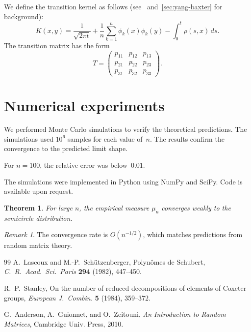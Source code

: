\documentclass{amsart}
\theoremstyle{plain}
\newtheorem{theorem}{Theorem}[section]
\theoremstyle{definition}
\theoremstyle{remark}
\newtheorem*{remark}{Remark}
\begin{document}
We define the transition kernel as follows (see~\cite{AGZ2010}
and~\ref{sec:yang-baxter} for background):
\begin{equation*}
K(x,y) = \frac{1}{\sqrt{2\pi t}}
        + \frac{1}{n} \sum_{k=1}^{n} \phi_k(x) \phi_k(y)
        - \int_0^t \rho(s,x)\, ds.
\end{equation*}
The transition matrix has the form
\begin{equation}
\label{eq:tmatrix}
T =
\begin{pmatrix} p_{11} & p_{12} & p_{13} \\ p_{21} & p_{22} & p_{23} \\ p_{31} & p_{32} & p_{33} \end{pmatrix}.
\end{equation}

\section{Numerical experiments}
\label{sec:numerical}
    We performed Monte Carlo simulations to verify the theoretical
    predictions.  The simulations used $10^6$ samples for each value
    of~$n$.    The results confirm the convergence to the predicted
    limit shape.

    For $n = 100$, the relative error was below~$0.01$.

    The simulations were implemented in Python using NumPy and SciPy.
    Code is available upon request.

\begin{theorem}
For large $n$, the empirical measure $\mu_n$ converges weakly to the
semicircle distribution.
\end{theorem}

\begin{remark}
The convergence rate is $O(n^{-1/2})$, which matches predictions from
random matrix theory.
\end{remark}

\begin{thebibliography}{99}
 A.~Lascoux and M.-P.~Sch\"utzenberger,
  Polyn\^omes de Schubert,
  \emph{C.~R.~Acad.~Sci.~Paris} \textbf{294} (1982), 447--450.

 R.~P.~Stanley,
  On the number of reduced decompositions of elements of Coxeter groups,
  \emph{European J.~Combin.} \textbf{5} (1984), 359--372.

 G.~Anderson, A.~Guionnet, and O.~Zeitouni,
  \emph{An Introduction to Random Matrices},
  Cambridge Univ. Press, 2010.
\end{thebibliography}
\end{document}
